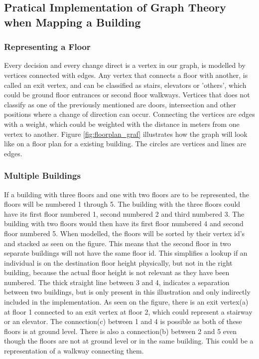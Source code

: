 \subsection{Pratical Implementation of Graph Theory when Mapping a Building}


\subsubsection{Representing a Floor}

Every decision and every change direct is a vertex in our graph, is modelled by vertices connected with edges. \label{e_vertex} Any vertex that connects a floor with another, is called an exit vertex, and can be classified as stairs, elevators or 'others', which could be ground floor entrances or second floor walkways. Vertices that does not classify as one of the previously mentioned are doors, intersection and other positions where a change of direction can occur. Connecting the vertices are edges with a weight, which could be weighted with the distance in meters from one vertex to another. Figure \ref{fig:floorplan_graf} illustrates how the graph will look like on a floor plan for a existing building. The circles are vertices and lines are edges.

\subsubsection{Multiple Buildings}



If a building with three floors and one with two floors are to be represented, the floors will be numbered 1 through 5. The building with the three floors could have its first floor numbered 1, second numbered 2 and third numbered 3. The building with two floors would then have its first floor numbered 4 and second floor numbered 5. When modelled, the floors will be sorted by their vertex id's and stacked as seen on the figure. This means that the second floor in two separate buildings will not have the same floor id. This simplifies a lookup if an individual is on the destination floor height physically, but not in the right building, because the actual floor height is not relevant as they have been numbered. The thick straight line between 3 and 4, indicates a separation between two buildings, but is only present in this illustration and only indirectly included in the implementation. As seen on the figure, there is an exit vertex(a) at floor 1 connected to an exit vertex at floor 2, which could represent a stairway or an elevator. The connection(c) between 1 and 4 is possible as both of these floors is at ground level. There is also a connection(b) between 2 and 5 even though the floors are not at ground level or in the same building. This could be a representation of a walkway connecting them.

